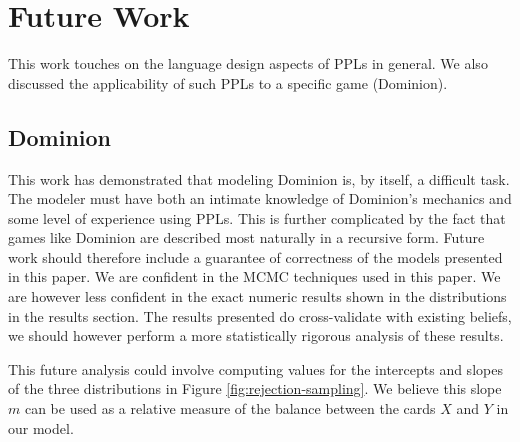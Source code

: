 
\section{Future Work} \label{sec:future}

This work touches on the language design aspects of PPLs
in general. We also discussed the applicability of such PPLs
to a specific game (Dominion).

\subsection{Dominion} \label{sec:future:dominion}

This work has demonstrated that modeling Dominion is, by itself,
a difficult task. The modeler must have both an intimate knowledge
of Dominion's mechanics and some level of experience using PPLs.
This is further complicated by the fact that games like Dominion
are described most naturally in a recursive form. Future work should
therefore include a guarantee of correctness of the models presented
in this paper. We are confident in the MCMC techniques used in this
paper. We are however less confident in the exact numeric results
shown in the distributions in the results section. The results
presented do cross-validate with existing beliefs, we should however
perform a more statistically rigorous analysis of these
results.

This future analysis could involve computing values for the
intercepts and slopes of the three distributions in Figure
\ref{fig:rejection-sampling}. We believe this slope $m$ can be used
as a relative measure of the balance between the cards $X$ and $Y$
in our model.




